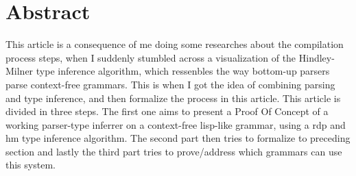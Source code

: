 \section{Abstract}
This article is a consequence of me doing some researches about the compilation process steps, when I suddenly stumbled across a visualization of the Hindley-Milner type inference algorithm, which ressenbles the way bottom-up parsers parse context-free grammars.
This is when I got the idea of combining parsing and type inference, and then formalize the process in this article.
This article is divided in three steps. The first one aims to present a Proof Of Concept of a working parser-type inferrer on a context-free lisp-like grammar, using a \acrlong{rdp} and \acrlong{hm} type inference algorithm. The second part then tries to formalize to preceding section and lastly the third part tries to prove/address which grammars can use this system.

\printglossaries


